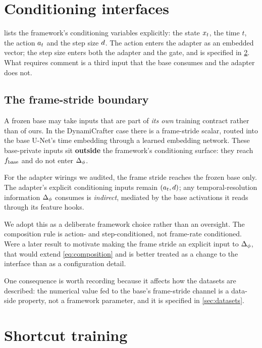 \section{Conditioning interfaces}
\label{sec:conditioning}

 lists the framework's conditioning variables
explicitly: the state $x_t$, the time $t$, the action $a_t$ and the step
size $d$. The action enters the adapter as an embedded vector; the step
size enters both the adapter and the gate, and is specified in
\cref{sec:shortcut}. What requires comment is a third input that the base
consumes and the adapter does not.

\subsection{The frame-stride boundary}

A frozen base may take inputs that are part of \emph{its own} training
contract rather than of ours. In the DynamiCrafter case there is a
frame-stride scalar, routed into the base U-Net's time embedding through a
learned embedding network. These base-private inputs sit \textbf{outside}
the framework's conditioning surface: they reach $f_{\mathrm{base}}$ and do not enter
$\Delta_{\phi}$.

For the adapter wirings we audited, the frame stride reaches the frozen base
only. The adapter's explicit conditioning inputs remain $(a_t, d)$; any
temporal-resolution information $\Delta_{\phi}$ consumes is \emph{indirect},
mediated by the base activations it reads through its feature hooks.

We adopt this as a deliberate framework choice rather than an oversight. The
composition rule is action- and step-conditioned, not frame-rate
conditioned. Were a later result to motivate making the frame stride an
explicit input to $\Delta_{\phi}$, that would extend \cref{eq:composition} and is
better treated as a change to the interface than as a configuration detail.

One consequence is worth recording because it affects how the datasets are
described: the numerical value fed to the base's frame-stride channel is a
data-side property, not a framework parameter, and it is specified in
\cref{sec:datasets}.

\section{Shortcut training}
\label{sec:shortcut}

